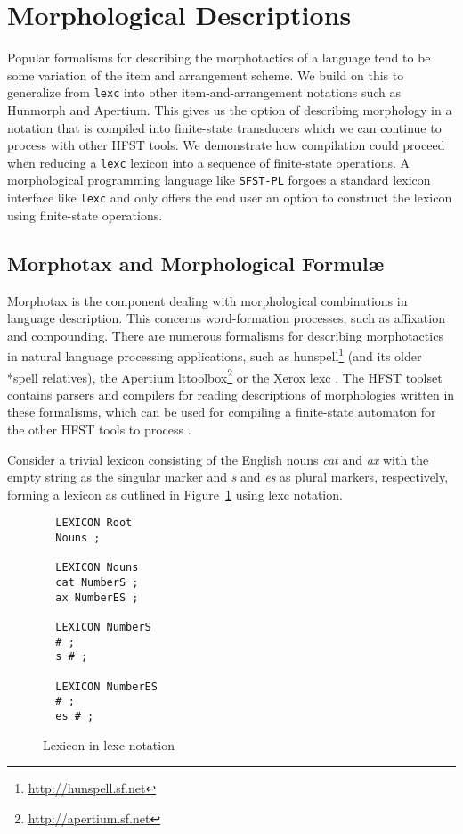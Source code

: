 \documentclass[draft]{llncs}
\begin{document}
\section{Morphological Descriptions}\label{MorphTools}


Popular formalisms for describing the morphotactics of a language tend to be some variation 
of the item and arrangement scheme. We build on this to generalize from \verb!lexc! into other
item-and-arrangement notations such as Hunmorph and Apertium. This gives us the option of describing
morphology in a notation that is compiled into finite-state transducers which we can continue to process with other
HFST tools. We demonstrate how compilation could proceed when reducing a \verb!lexc! lexicon into a sequence of
finite-state operations. A morphological programming language like \verb!SFST-PL! forgoes a standard lexicon interface
like \verb!lexc! and only offers the end user an option to construct the lexicon using finite-state operations. 

\subsection{Morphotax and Morphological Formul\ae}

Morphotax is the component dealing with morphological combinations in language
description. This concerns word-formation processes, such as affixation and
compounding.  There are numerous formalisms for describing morphotactics in natural
language processing applications, such as
hunspell\footnote{\url{http://hunspell.sf.net}} (and its older *spell
relatives), the Apertium lttoolbox\footnote{\url{http://apertium.sf.net}} or
the Xerox lexc \cite{beesley/2003}. The HFST toolset contains parsers and
compilers for reading descriptions of morphologies written in these formalisms,
which can be used for compiling a finite-state automaton for the other HFST
tools to process \cite{pirinen/2010/il,linden/2009/sfcm}.

Consider a trivial lexicon consisting of the English nouns \emph{cat} and
\emph{ax} with the empty string as the singular marker and \emph{s} and
\emph{es} as plural markers, respectively,  forming a lexicon as outlined in
Figure~\ref{fig:morph0} using lexc notation.

\begin{figure} [h]
{\footnotesize
\begin{verbatim}
  LEXICON Root
  Nouns ;

  LEXICON Nouns
  cat NumberS ;
  ax NumberES ;

  LEXICON NumberS
  # ;
  s # ;

  LEXICON NumberES
  # ;
  es # ;
\end{verbatim}
}
\caption{Lexicon in lexc notation}
\label{fig:morph0}
\end{figure}
\end{document}
